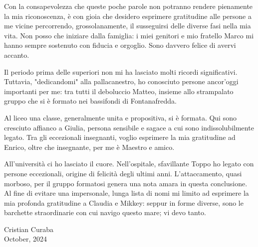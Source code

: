 \documentclass[a4paper,12pt,twoside,openany]{book}
\begin{document}
Con la consapevolezza che queste poche parole non potranno rendere pienamente la mia riconoscenza, è con gioia che desidero esprimere gratitudine alle persone a me vicine percorrendo, grossolanamente, il susseguirsi delle diverse fasi nella mia vita.
Non posso che iniziare dalla famiglia: i miei genitori e mio fratello Marco mi hanno sempre sostenuto con fiducia e orgoglio. Sono davvero felice di avervi accanto.

Il periodo prima delle superiori non mi ha lasciato molti ricordi significativi. Tuttavia, "dedicandomi" alla pallacanestro, ho conosciuto persone ancor'oggi importanti per me: tra tutti il deboluccio Matteo, insieme allo strampalato gruppo che si è formato nei bassifondi di Fontanafredda.

Al liceo una classe, generalmente unita e propositiva, si è formata. Qui sono cresciuto affianco a Giulia, persona sensibile e sagace a cui sono indissolubilmente legato. Tra gli eccezionali insegnanti, voglio esprimere la mia gratitudine ad Enrico, oltre che insegnante, per me è Maestro e amico.

All'università ci ho lasciato il cuore. Nell'ospitale, sfavillante Toppo ho legato con persone eccezionali, origine di felicità degli ultimi anni. L'attaccamento, quasi morboso, per il gruppo formatosi genera una nota amara in questa conclusione. Al fine di evitare una impersonale, lunga lista di nomi mi limito ad esprimere la mia profonda gratitudine a Claudia e Mikkey: seppur in forme diverse, sono le barchette straordinarie con cui navigo questo mare; vi devo tanto. 

\begin{flushright}
Cristian Curaba \\
October, 2024
\end{flushright}


\newpage
\clearpage
\thispagestyle{empty}
\
\newpage


\clearpage                       %
{                                %
  \pagestyle{empty}              %
  \fancypagestyle{plain}         %
  {
    \fancyhf{}%
    \renewcommand{\headrulewidth}{0pt}%
    \renewcommand{\footrulewidth}{0pt}%
  }
  \tableofcontents
  \thispagestyle{empty}          %
}
\newpage
\end{document}
